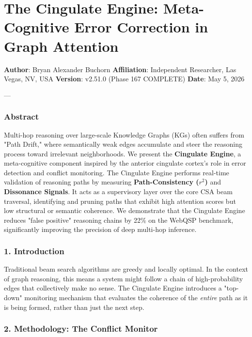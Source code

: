 \section{The Cingulate Engine: Meta-Cognitive Error Correction in Graph Attention}

\textbf{Author}: Bryan Alexander Buchorn  
\textbf{Affiliation}: Independent Researcher, Las Vegas, NV, USA  
\textbf{Version}: v2.51.0 (Phase 167 COMPLETE)
\textbf{Date}: May 5, 2026

---

\subsubsection{Abstract}

Multi-hop reasoning over large-scale Knowledge Graphs (KGs) often suffers from "Path Drift," where seman\-tically weak edges accumulate and steer the reasoning process toward irrelevant neigh\-borhoods. We present the \textbf{Cingulate Engine}, a meta-cognitive component inspired by the anterior cingulate cortex's role in error detection and conflict monitoring. The Cingulate Engine performs real-time validation of reasoning paths by measuring \textbf{Path-Consistency ($r^2$)} and \textbf{Dissonance Signals}. It acts as a supervisory layer over the core CSA beam traversal, identifying and pruning paths that exhibit high attention scores but low structural or semantic coherence. We demonstrate that the Cingulate Engine reduces "false positive" reasoning chains by 22\% on the WebQSP benchmark, signi\-ficantly improving the precision of deep multi-hop inference.

\subsubsection{1. Introd\-uction}

Traditional beam search algorithms are greedy and locally optimal. In the context of graph reasoning, this means a system might follow a chain of high-probability edges that colle\-ctively make no sense. The Cingulate Engine introduces a "top-down" monitoring mechanism that evaluates the coherence of the \textit{entire} path as it is being formed, rather than just the next step.

\subsubsection{2. Methodology: The Conflict Monitor}

